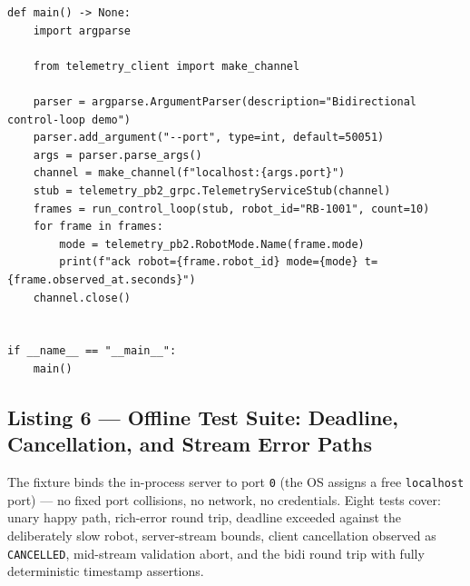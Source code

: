 \begin{verbatim}
def main() -> None:
    import argparse

    from telemetry_client import make_channel

    parser = argparse.ArgumentParser(description="Bidirectional control-loop demo")
    parser.add_argument("--port", type=int, default=50051)
    args = parser.parse_args()
    channel = make_channel(f"localhost:{args.port}")
    stub = telemetry_pb2_grpc.TelemetryServiceStub(channel)
    frames = run_control_loop(stub, robot_id="RB-1001", count=10)
    for frame in frames:
        mode = telemetry_pb2.RobotMode.Name(frame.mode)
        print(f"ack robot={frame.robot_id} mode={mode} t={frame.observed_at.seconds}")
    channel.close()


if __name__ == "__main__":
    main()
\end{verbatim}

\subsection{Listing 6 --- Offline Test Suite: Deadline, Cancellation, and Stream Error Paths}
\label{subsec:ch13-code-tests}

The fixture binds the in-process server to port \texttt{0} (the OS assigns a
free \texttt{localhost} port) --- no fixed port collisions, no network, no
credentials. Eight tests cover: unary happy path, rich-error round trip,
deadline exceeded against the deliberately slow robot, server-stream bounds,
client cancellation observed as \texttt{CANCELLED}, mid-stream validation
abort, and the bidi round trip with fully deterministic timestamp assertions.

